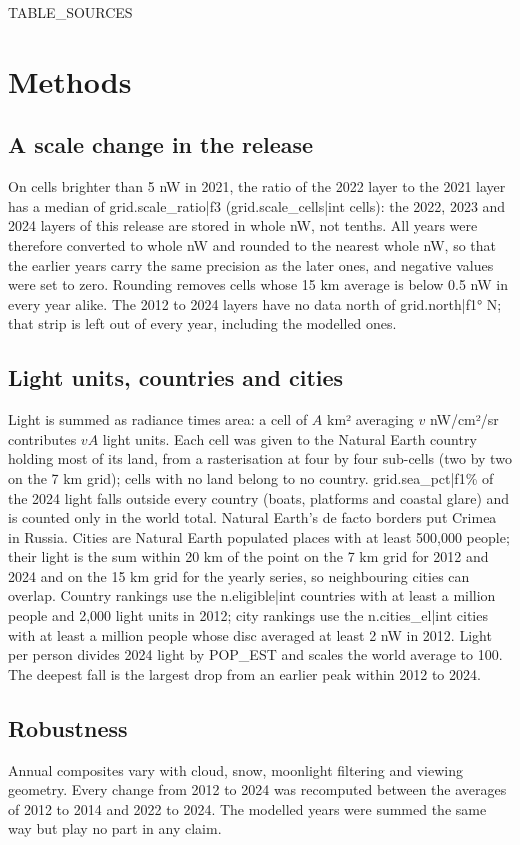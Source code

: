 \documentclass[11pt,a4paper]{article}
\begin{document}
{{TABLE_SOURCES}}

\section{Methods}
\subsection{A scale change in the release}
On cells brighter than 5 nW in 2021, the ratio of the 2022 layer to the 2021 layer has a median of {{grid.scale_ratio|f3}} ({{grid.scale_cells|int}} cells): the 2022, 2023 and 2024 layers of this release are stored in whole nW, not tenths. All years were therefore converted to whole nW and rounded to the nearest whole nW, so that the earlier years carry the same precision as the later ones, and negative values were set to zero. Rounding removes cells whose 15 km average is below 0.5 nW in every year alike. The 2012 to 2024 layers have no data north of {{grid.north|f1}}° N; that strip is left out of every year, including the modelled ones.

\subsection{Light units, countries and cities}
Light is summed as radiance times area: a cell of $A$ km² averaging $v$ nW/cm²/sr contributes $vA$ light units. Each cell was given to the Natural Earth country holding most of its land, from a rasterisation at four by four sub-cells (two by two on the 7 km grid); cells with no land belong to no country. {{grid.sea_pct|f1}}\% of the 2024 light falls outside every country (boats, platforms and coastal glare) and is counted only in the world total. Natural Earth's de facto borders put Crimea in Russia. Cities are Natural Earth populated places with at least 500,000 people; their light is the sum within 20 km of the point on the 7 km grid for 2012 and 2024 and on the 15 km grid for the yearly series, so neighbouring cities can overlap. Country rankings use the {{n.eligible|int}} countries with at least a million people and 2,000 light units in 2012; city rankings use the {{n.cities_el|int}} cities with at least a million people whose disc averaged at least 2 nW in 2012. Light per person divides 2024 light by POP\_EST and scales the world average to 100. The deepest fall is the largest drop from an earlier peak within 2012 to 2024.

\subsection{Robustness}
Annual composites vary with cloud, snow, moonlight filtering and viewing geometry. Every change from 2012 to 2024 was recomputed between the averages of 2012 to 2014 and 2022 to 2024. The modelled years were summed the same way but play no part in any claim.
\end{document}
